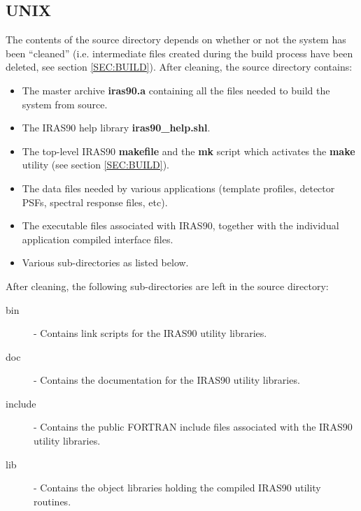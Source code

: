 \subsection{UNIX}
The contents of the source directory depends on whether
or not the system has been ``cleaned'' (i.e. intermediate files created during
the build process have been deleted, see section \ref{SEC:BUILD}). After
cleaning, the source directory contains: 

\begin{itemize}

\item The master archive {\bf iras90.a} containing all the files needed to build
the system from source. 

\item The {\small IRAS90} help library {\bf iras90\_help.shl}.

\item The top-level {\small IRAS90} {\bf makefile} and the {\bf mk} script which 
activates the {\bf make} utility (see section \ref{SEC:BUILD}).

\item The data files needed by various applications (template profiles, detector 
{\small PSF}s, spectral response files, etc).

\item The executable files associated with {\small IRAS90},
together with the individual application compiled interface files. 

\item Various sub-directories as listed below.

\end{itemize}

After cleaning, the following sub-directories are left in the source directory:
\begin{description}

\item [bin] - Contains link scripts for the {\small IRAS90} utility 
libraries.

\item [doc] - Contains the documentation for the {\small IRAS90} utility 
libraries.

\item [include] - Contains the public {\small FORTRAN} include files associated
with the {\small IRAS90} utility libraries. 

\item [lib] - Contains the object libraries holding the
compiled {\small IRAS90} utility routines. 
\end{description}

